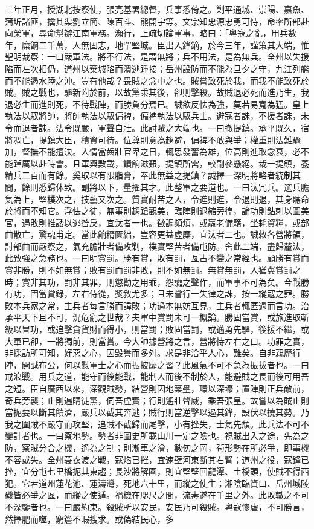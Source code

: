 \begin{pinyinscope}
三年正月，授湖北按察使，張亮基署總督，兵事悉倚之。剿平通城、崇陽、嘉魚、蒲圻諸匪，擒其渠劉立簡、陳百斗、熊開宇等。文宗知忠源忠勇可恃，命率所部赴向榮軍，尋命幫辦江南軍務。瀕行，上疏切論軍事，略曰：「粵寇之亂，用兵數年，糜餉二千萬，人無固志，地罕堅城。臣出入鋒鏑，於今三年，謹策其大端，惟聖明裁察：一曰嚴軍法。將不行法，是謂無將；兵不用法，是為無兵。全州以失援陷而左次相仍，道州以棄城陷而潰逃踵接；岳州設防而不能為旦夕之守，九江列艦而不能遏水陸之沖。豈有他哉？畏賊之念中之也。賊嘗致死於我，而我不能致死於賊。賊之戰也，驅新附於前，以故黨乘其後，卻則擊殺。故賊退必死而進乃生，我退必生而進則死，不待戰陣，而勝負分焉已。誠欲反怯為強，莫若易寬為猛。皇上執法以馭將帥，將帥執法以馭偏裨，偏裨執法以馭兵士。避寇者誅，不援者誅，未令而退者誅。法令既嚴，軍聲自壯。此討賊之大端也。一曰撤提鎮。承平既久，宿將凋亡，提鎮大臣，積資可待。位尊則意為趨避，偏裨不敢與爭；權重則法難驟加，督撫不能擅決。人情當齒壯官卑之日，輒思發奮為雄，位高則進取念衰，必不能踔厲以赴時會。且軍興數載，饋餉滋艱，提鎮所需，較副參懸絕。裁一提鎮，養精兵二百而有餘。奚取以有限脂膏，奉此無益之提鎮？誠擇一深明將略者統制其間，餘則悉歸休致。副將以下，量擢其才。此整軍之要道也。一曰汰冗兵。選兵膽氣為上，堅樸次之，技藝又次之。質實耐苦之人，令進則進，令退則退，其身聽命於將而不知它。浮怯之徒，無事則趨蹌觀美，臨陣則退縮旁徨，論功則鉆刺以圖美官，遇敗則推諉以逃咎戾，宜汰者一也。徵調頻煩，或羸老備籍，坐耗資糧，或部曲散亡，驚魂甫定。當此餉糈匱絀，豈容更益虛糜，宜汰者二也。誠敕各營將領，討部曲而嚴察之，氣充膽壯者備攻剿，樸實堅苦者備屯防。舍此二端，盡歸釐汰，此致強之急務也。一曰明賞罰。勝有賞，敗有罰，亙古不變之常經也。顧勝有賞而賞非勝，則不如無賞；敗有罰而罰非敗，則不如無罰。無賞無罰，人猶冀賞罰之時；賞非其功，罰非其罪，則懲勸之用乖，怨讟之聲作，而軍事不可為矣。今戰勝有功，固當賞錄，左右侍從，獎敘尤多；且未嘗行一失律之誅，按一縱寇之罪。勝敗本兵家之常，主兵者每言勝而諱敗；功過本無妨互見，主兵者輒匿過而言功。治承平天下且不可，況危亂之世哉？夫軍中賞罰未可一概論。勝固當賞，或旅進取斬級以冒功，或追擊貪貨財而得小，則當罰；敗固當罰，或邁勇先驅，後援不繼，或大軍已卻，一將獨前，則當賞。今大帥據營將之言，營將恃左右之口。功罪之實，非採訪所可知，好惡之心，因毀譽而多舛。求是非洽乎人心，難矣。自非親歷行陣，開誠布公，何以慰軍士之心而振披靡之習？此風氣不可不急為振拔者也。一曰戒浪戰。用兵之道，能守而後能戰，能制人而後不制於人，能避賊之長而後可用吾之短。臣自廣西以來，深觀賊勢，結營則因地築壘，環以深壕；置陣則正兵敵前，奇兵旁襲；止則遍購徒黨，伺吾虛實；行則遙壯聲威，乘吾張皇。故嘗以為賊止則當扼要以斷其饋濟，嚴兵以截其奔逃；賊行則當逆擊以遏其鋒，設伏以撓其勢。乃我之圍賊不嚴守而攻堅，追賊不截歸而尾擊，小有挫失，士氣先頹。此兵法不可不變計者也。一曰察地勢。勢者非圖史所載山川一定之險也。視賊出入之途，先為之防，察賊分合之機，遙為之制；則漸車之澮，數仞之岡，茍形勢在所必爭，即事機不容或失。全州蓑衣渡之戰，寇焰已摧，宜速壁河東斷其右臂；道州之役，寇鋒已挫，宜分屯七里橋扼其東趨；長沙將解圍，則宜堅壁回龍潭、土橋頭，使賊不得西犯。它若道州蓮花池、蓮濤灣，死地六十里，而縱之使生；湘陰臨資口、岳州城陵磯皆必爭之區，而縱之使遁。禍機在咫尺之間，流毒遂在千里之外。此敗轍之不可不深鑒者也。一曰嚴約束。殺賊所以安民，安民乃可殺賊。粵寇慘虐，不可勝言，然擇肥而噬，窮簷不暇搜求。或偽結民心，多
\end{pinyinscope}
